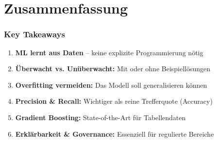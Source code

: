 \documentclass[11pt, aspectratio=169]{beamer}
\begin{document}
\section{Zusammenfassung}

\begin{frame}
    \frametitle{Key Takeaways}
    \begin{enumerate}
        \item \textbf{ML lernt aus Daten} -- keine explizite Programmierung nötig
        \vspace{0.2cm}
        \item \textbf{Überwacht vs. Unüberwacht:} Mit oder ohne Beispiellösungen
        \vspace{0.2cm}
        \item \textbf{Overfitting vermeiden:} Das Modell soll generalisieren können
        \vspace{0.2cm}
        \item \textbf{Precision \& Recall:} Wichtiger als reine Trefferquote (Accuracy)
        \vspace{0.2cm}
        \item \textbf{Gradient Boosting:} State-of-the-Art für Tabellendaten
        \vspace{0.2cm}
        \item \textbf{Erklärbarkeit \& Governance:} Essenziell für regulierte Bereiche
    \end{enumerate}
\end{frame}
\end{document}
